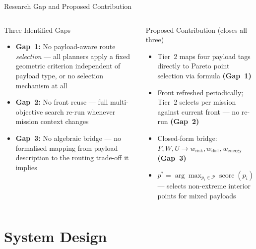 \documentclass[aspectratio=169,11pt]{beamer}
\begin{document}
\begin{frame}{Research Gap and Proposed Contribution}
  \begin{columns}[T,onlytextwidth]
      \begin{block}{Three Identified Gaps}
        \begin{itemize}
          \item \textbf{Gap~1:} No payload-aware route \emph{selection} ---
                all planners apply a fixed geometric criterion independent of
                payload type, or no selection mechanism at all
          \item \textbf{Gap~2:} No front reuse --- full multi-objective
                search re-run whenever mission context changes
          \item \textbf{Gap~3:} No algebraic bridge --- no formalised
                mapping from payload description to the routing trade-off it
                implies
        \end{itemize}
      \end{block}
      \begin{block}{Proposed Contribution (closes all three)}
        \begin{itemize}
          \item Tier~2 maps four payload tags directly to Pareto point
                selection via formula \textbf{(Gap~1)}
          \item Front refreshed periodically; Tier~2 selects per mission
                against current front --- no re-run \textbf{(Gap~2)}
          \item Closed-form bridge:
                $F,W,U \!\rightarrow\! w_\mathrm{risk},w_\mathrm{dist},w_\mathrm{energy}$
                \textbf{(Gap~3)}
          \item $p^* = \arg\max_{p_i\in\mathcal{P}}\operatorname{score}(p_i)$
                --- selects non-extreme interior points for mixed payloads
        \end{itemize}
      \end{block}
  \end{columns}
\end{frame}

\section{System Design}
\end{document}
